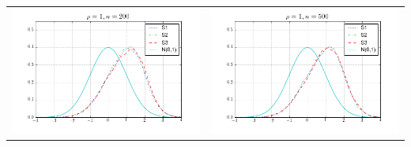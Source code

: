 \begin{table}[!ht]
{\begin{tabular}{c c}
\includegraphics[width=8cm]{beta1_t_ratio_200_1} & \includegraphics[width=8cm]{beta1_t_ratio_500_1} \\
\end{tabular}
}
\end{table}




